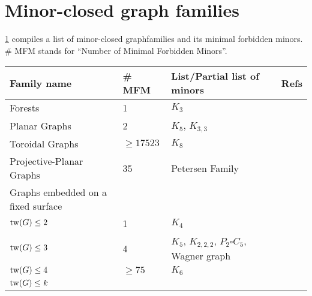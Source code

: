 \section{Minor-closed graph families}\label{sec:minor_closed_families}

\cref{tab:minor-closed families} compiles a list of minor-closed graphfamilies and its minimal forbidden minors. \# MFM stands for ``Number of Minimal Forbidden Minors''.

\begin{table}[h!]\label{tab:minor-closed families}
    
    \centering
    \begin{tabular}{@{}llll@{}}
    \toprule
    Family name                  & \# MFM & List/Partial list of minors                      & Refs \\ \midrule
    Forests                      & 1                                  & $K_3$                                            &            \\
    Planar Graphs                & 2                                  & $K_5$, $K_{3,3}$                                 & \tablefootnote{\textcite{wagnerUeberEigenschaftEbenen1937}}           \\
    Toroidal Graphs              & $\geq 17523$                       & $K_8$                                            & \tablefootnote{\textcite{myrvoldLargeSetTorus2018}}           \\
    Projective-Planar Graphs     & 35                                 & Petersen Family                                  & \tablefootnote{\textcite{moharGraphsSurfaces2001}}           \\
    Graphs embedded on a fixed surface & & &\\
    $\operatorname{tw}(G) \leq 2$              & 1                                  & $K_4$                                            &            \\
    $\operatorname{tw}(G) \leq 3$              & 4                                  & $K_5$, $K_{2,2,2}$, $P_2 \square C_5$, Wagner graph & \tablefootnote{\textcite{arnborgForbiddenMinorsCharacterization1990}}           \\
    $\operatorname{tw}(G) \leq 4$              & $\geq 75$                          & $K_6$                                            & \tablefootnote{\textcite{sandersLinearAlgorithmsGraphs1993}}           \\
    $\operatorname{tw}(G) \leq k$              &                                    &                                                  &            \\

\end{tabular}
\end{table}
